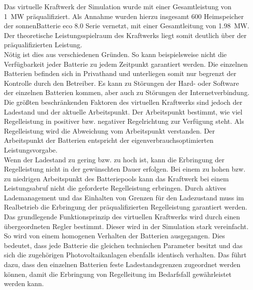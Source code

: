 Das virtuelle Kraftwerk der Simulation wurde mit einer Gesamtleistung von \SI{1}{\mega\watt} präqualifiziert. Als Annahme wurden hierzu insgesamt 600 Heimspeicher der sonnenBatterie eco 8.0 Serie vernetzt, mit einer Gesamtleitung von \SI{1.98}{\mega\watt}. Der theoretische Leistungsspielraum des Kraftwerks liegt somit deutlich über der präqualifizierten Leistung.\\
Nötig ist dies aus verschiedenen Gründen. So kann beispielsweise nicht die Verfügbarkeit jeder Batterie zu jedem Zeitpunkt garantiert werden. Die einzelnen Batterien befinden sich in Privathand und unterliegen somit nur begrenzt der Kontrolle durch den Betreiber. Es kann zu Störungen der Hard- oder Software der einzelnen Batterien kommen, aber auch zu Störungen der Internetverbindung.\\
Die größten beschränkenden Faktoren des virtuellen Kraftwerks sind jedoch der Ladestand und der aktuelle Arbeitspunkt. Der Arbeitspunkt bestimmt, wie viel Regelleistung in positiver bzw. negativer Regelrichtung zur Verfügung steht. Als Regelleistung wird die Abweichung vom Arbeitspunkt verstanden. Der Arbeitspunkt der Batterien entspricht der eigenverbrauchsoptimierten Leistungsvorgabe.\\
Wenn der Ladestand zu gering bzw. zu hoch ist, kann die Erbringung der Regelleistung nicht in der gewünschten Dauer erfolgen. Bei einem zu hohen bzw. zu niedrigen Arbeitspunkt des Batteriepools kann das Kraftwerk bei einem Leistungsabruf nicht die geforderte Regelleistung erbringen. Durch aktives Lademanagement und das Einhalten von Grenzen für den Ladezustand muss im Realbetrieb die Erbringung der präqualifizierten Regelleistung garantiert werden.\\
Das grundlegende Funktionsprinzip des virtuellen Kraftwerks wird durch einen übergeordneten Regler bestimmt. Dieser wird in der Simulation stark vereinfacht. So wird von einem homogenen Verhalten der Batterien ausgegangen. Dies bedeutet, dass jede Batterie  die gleichen technischen Parameter besitzt und das sich die zugehörigen Photovoltaikanlagen ebenfalls identisch verhalten. Das führt dazu, dass den einzelnen Batterien feste Ladestandsgrenzen zugeordnet werden können, damit die Erbringung von Regelleitung im Bedarfsfall gewährleistet werden kann.

